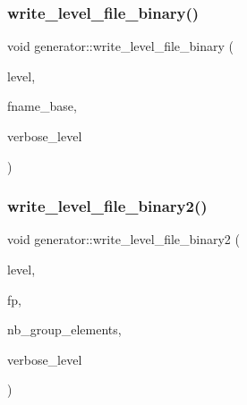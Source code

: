 \subsubsection{\texorpdfstring{write\+\_\+level\+\_\+file\+\_\+binary()}{write\_level\_file\_binary()}}
{\footnotesize\ttfamily void generator\+::write\+\_\+level\+\_\+file\+\_\+binary (\begin{DoxyParamCaption}\item[{\mbox{\hyperlink{galois_8h_a09fddde158a3a20bd2dcadb609de11dc}{I\+NT}}}]{level,  }\item[{\mbox{\hyperlink{galois_8h_ab6cc7b4aeb6ea31aba2b3fbfc83ff5e6}{B\+Y\+TE}} $\ast$}]{fname\+\_\+base,  }\item[{\mbox{\hyperlink{galois_8h_a09fddde158a3a20bd2dcadb609de11dc}{I\+NT}}}]{verbose\+\_\+level }\end{DoxyParamCaption})}

\mbox{\label{classgenerator_ae37a4c0debe10a44f17db9fb618578ec}} 
\subsubsection{\texorpdfstring{write\+\_\+level\+\_\+file\+\_\+binary2()}{write\_level\_file\_binary2()}}
{\footnotesize\ttfamily void generator\+::write\+\_\+level\+\_\+file\+\_\+binary2 (\begin{DoxyParamCaption}\item[{\mbox{\hyperlink{galois_8h_a09fddde158a3a20bd2dcadb609de11dc}{I\+NT}}}]{level,  }\item[{F\+I\+LE $\ast$}]{fp,  }\item[{\mbox{\hyperlink{galois_8h_a09fddde158a3a20bd2dcadb609de11dc}{I\+NT}} \&}]{nb\+\_\+group\+\_\+elements,  }\item[{\mbox{\hyperlink{galois_8h_a09fddde158a3a20bd2dcadb609de11dc}{I\+NT}}}]{verbose\+\_\+level }\end{DoxyParamCaption})}

\mbox{\label{classgenerator_a4427cbf38ba677033cea15f1ca62cce0}} 

